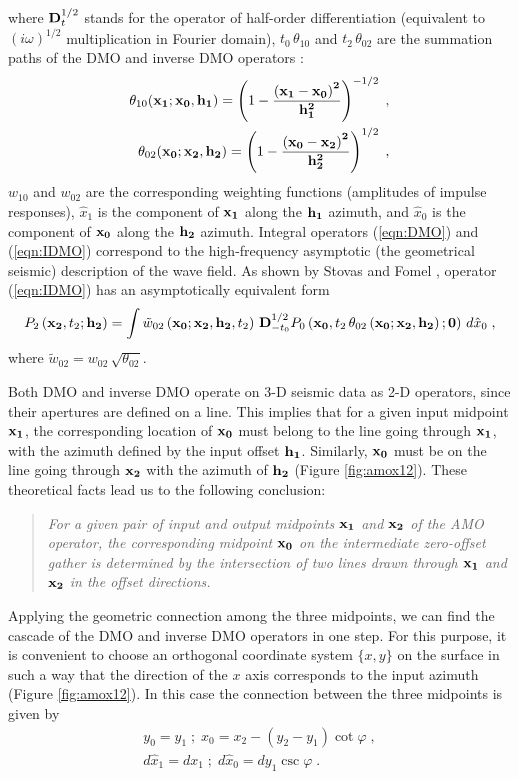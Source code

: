 where ${\bf D}_t^{1/2}$ stands for the operator of half-order differentiation
(equivalent to $(i \omega)^{1/2}$ multiplication in Fourier domain),
$t_0\, \theta_{10}$ and $t_2\,\theta_{02}$ are the summation paths of
the DMO and inverse DMO  
operators \cite{GPR29-03-03740406}:
\begin{eqnarray}
\theta_{10}({\bf x_1;x_0, h_1})=
\left(1-{\bf \left(x_1-x_0\right)^2 \over h_1^2}\right)^{-1/2}\;,
\label{eqn:DMOtt}\\
\theta_{02}({\bf x_0;x_2, h_2})=
\left(1-{\bf \left(x_0-x_2\right)^2 \over h_2^2}\right)^{1/2}\;,
\label{eqn:IDMOtt}
\end{eqnarray}
$w_{10}$ and $w_{02}$ are the corresponding weighting functions (amplitudes of
impulse responses), $\hat{x}_1$ is the component of ${\bf x_1}$ along the
${\bf h_1}$ azimuth, and $\hat{x}_0$ is the component of ${\bf x_0}$
along the
${\bf h_2}$ azimuth. 
Integral operators (\ref{eqn:DMO}) and (\ref{eqn:IDMO}) correspond to
the high-frequency asymptotic (the geometrical seismic) description of
the wave field. As shown by Stovas and Fomel , 
operator (\ref{eqn:IDMO}) has an asymptotically equivalent
form
\begin{equation}
P_2\left({\bf x_2},t_2;{\bf h_2}\right)=\int 
\tilde{w}_{02}\left({\bf x_0;x_2, h_2},t_2\right)\,
{\bf D}_{-t_0}^{1/2}P_0\left({\bf x_0},t_2\,\theta_{02}
\left({\bf x_0;x_2, h_2}\right);
{\bf 0}\right)\,d\hat{x}_0\;,
\label{eqn:tIDMO}
\end{equation}
where $\tilde{w}_{02}=w_{02}\,\sqrt{\theta_{02}}$.
\par
Both DMO and inverse DMO operate on 3-D seismic data
as 2-D operators, since their apertures are defined on a line. This
implies that for a given input midpoint ${\bf x_1}$, the corresponding
location of ${\bf x_0}$ must belong to the
line going through ${\bf x_1}$, with the azimuth defined by the input
offset ${\bf h_1}$. 
Similarly, ${\bf x_0}$ must be on the line going through 
${\bf x_2}$ with the azimuth of ${\bf h_2}$ (Figure \ref{fig:amox12}).
These theoretical facts lead us to the following conclusion: 
\begin{quote}
{\em For a given pair of input and output midpoints ${\bf x_1}$ and ${\bf x_2}$
of the AMO operator, the corresponding midpoint ${\bf x_0}$ on
the intermediate zero-offset gather is determined by the  intersection of 
two lines drawn
through ${\bf x_1}$ and ${\bf x_2}$
in the offset directions.} 
\end{quote}
Applying the geometric connection among the three midpoints, we can
find the cascade 
of the DMO
and inverse DMO operators in one step.
For this purpose, it is convenient to choose an orthogonal coordinate
system $\{x,y\}$ on the 
surface in such a way that the direction of the $x$ axis corresponds
to the input azimuth 
(Figure \ref{fig:amox12}).
In this case the connection between the three midpoints is given by
\begin{eqnarray}
y_0=y_1\;;\;x_0=x_2-\left(y_2-y_1\right) \cot{\varphi}\;,
\label{eqn:x012}\\
d\hat{x}_1=dx_1\;;\;d\hat{x}_0=dy_1 \csc{\varphi}\;.
\label{eqn:jacob}
\end{eqnarray}

